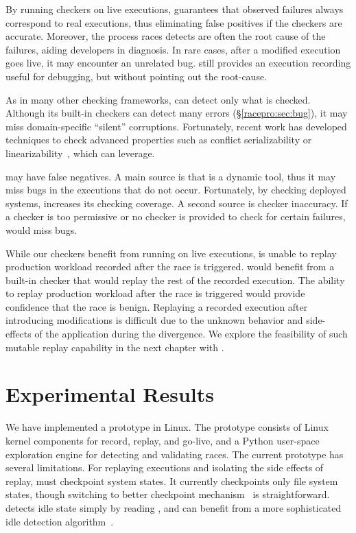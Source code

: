 By running checkers on live executions, \racepro guarantees that observed
failures always correspond to real executions, thus eliminating false
positives if the checkers are accurate.  Moreover, the process races \racepro
detects are often the root cause of the failures, aiding developers in
diagnosis.  In rare cases, after a modified execution goes live, it may
encounter an unrelated bug.  \racepro still provides an execution recording
useful for debugging, but without pointing out the root-cause.

As in many other checking frameworks, \racepro can detect only what is checked.
Although its built-in checkers can detect many errors
(\S\ref{racepro:sec:bug}), it may miss domain-specific ``silent''
corruptions.  Fortunately, recent work has developed techniques to check
advanced properties such as conflict serializability or
linearizability~\cite{linearizable:eurosys11}, which \racepro can leverage.

\racepro may have false negatives.  A main source is that \racepro is a dynamic
tool, thus it may miss bugs in the executions that do not occur.
Fortunately, by checking deployed systems, \racepro increases its checking
coverage.  A second source is checker inaccuracy.  If a checker is too
permissive or no checker is provided to check for certain failures, \racepro
would miss bugs.

While our checkers benefit from running on live executions, \racepro is unable
to replay production workload recorded after the race is triggered.
\racepro would benefit from a built-in checker that would replay the rest of the
recorded execution. The ability to replay production workload after the race is
triggered would provide confidence that the race is benign.
Replaying a recorded execution after introducing modifications is difficult due
to the unknown behavior and side-effects of the application during the
divergence. We explore the feasibility of such mutable replay capability in the
next chapter with \dora.

\section{Experimental Results} \label{racepro:sec:eval}

We have implemented a \racepro prototype in Linux.  The prototype
consists of Linux kernel components for record, replay, and go-live, and a
Python user-space exploration engine for detecting and
validating races.  The current prototype has several limitations.  For
replaying executions and isolating the side effects of replay, \racepro
must checkpoint system states.  It currently checkpoints only file
system states, though switching to better checkpoint
mechanism~\cite{zap02} is straightforward.  \racepro detects idle
state simply by reading , and can benefit from a more
sophisticated idle detection algorithm~\cite{boinc}.

